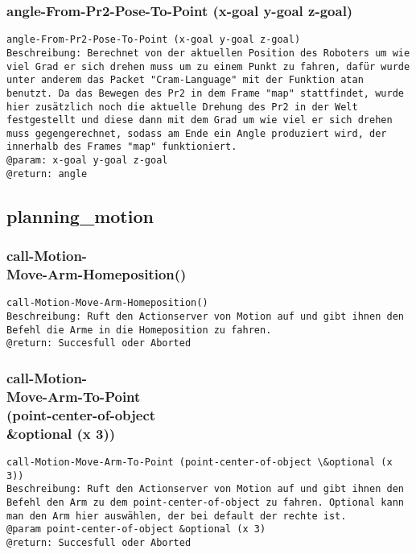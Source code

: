 \documentclass{suturo}
\begin{document}
\subsubsection{angle-From-Pr2-Pose-To-Point (x-goal y-goal z-goal)}
\begin{verbatim}
angle-From-Pr2-Pose-To-Point (x-goal y-goal z-goal)
Beschreibung: Berechnet von der aktuellen Position des Roboters um wie viel Grad er sich drehen muss um zu einem Punkt zu fahren, dafür wurde unter anderem das Packet "Cram-Language" mit der Funktion atan benutzt. Da das Bewegen des Pr2 in dem Frame "map" stattfindet, wurde hier zusätzlich noch die aktuelle Drehung des Pr2 in der Welt festgestellt und diese dann mit dem Grad um wie viel er sich drehen muss gegengerechnet, sodass am Ende ein Angle produziert wird, der innerhalb des Frames "map" funktioniert. 
@param: x-goal y-goal z-goal 
@return: angle 
\end{verbatim}

\subsection{planning\_motion}

\subsubsection{call-Motion-\\
Move-Arm-Homeposition()}
\begin{verbatim}
call-Motion-Move-Arm-Homeposition()
Beschreibung: Ruft den Actionserver von Motion auf und gibt ihnen den Befehl die Arme in die Homeposition zu fahren.
@return: Succesfull oder Aborted
\end{verbatim}





\subsubsection{call-Motion-\\
Move-Arm-To-Point \\(point-center-of-object\\ \&optional (x 3))
}
\begin{verbatim}
call-Motion-Move-Arm-To-Point (point-center-of-object \&optional (x 3))
Beschreibung: Ruft den Actionserver von Motion auf und gibt ihnen den Befehl den Arm zu dem point-center-of-object zu fahren. Optional kann man den Arm hier auswählen, der bei default der rechte ist.
@param point-center-of-object &optional (x 3)
@return: Succesfull oder Aborted
\end{verbatim}
\end{document}
